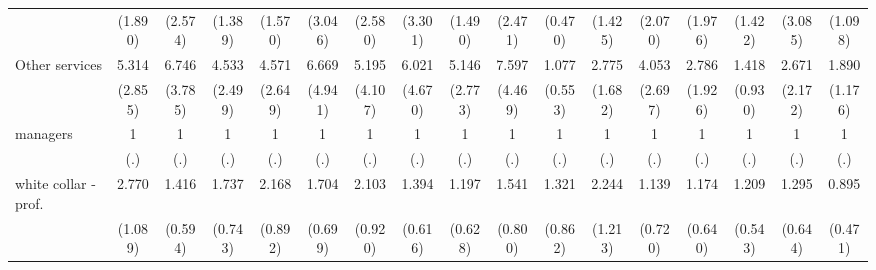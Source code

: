 {\begin{tabular}{l*{16}{c}}
                    &     (1.890)         &     (2.574)         &     (1.389)         &     (1.570)         &     (3.046)         &     (2.580)         &     (3.301)         &     (1.490)         &     (2.471)         &     (0.470)         &     (1.425)         &     (2.070)         &     (1.976)         &     (1.422)         &     (3.085)         &     (1.098)         \\
[1em]
Other services      &       5.314\sym{**} &       6.746\sym{***}&       4.533\sym{**} &       4.571\sym{**} &       6.669\sym{*}  &       5.195\sym{*}  &       6.021\sym{*}  &       5.146\sym{**} &       7.597\sym{***}&       1.077         &       2.775         &       4.053\sym{*}  &       2.786         &       1.418         &       2.671         &       1.890         \\
                    &     (2.855)         &     (3.785)         &     (2.499)         &     (2.649)         &     (4.941)         &     (4.107)         &     (4.670)         &     (2.773)         &     (4.469)         &     (0.553)         &     (1.682)         &     (2.697)         &     (1.926)         &     (0.930)         &     (2.172)         &     (1.176)         \\
[1em]
managers            &           1         &           1         &           1         &           1         &           1         &           1         &           1         &           1         &           1         &           1         &           1         &           1         &           1         &           1         &           1         &           1         \\
                    &         (.)         &         (.)         &         (.)         &         (.)         &         (.)         &         (.)         &         (.)         &         (.)         &         (.)         &         (.)         &         (.)         &         (.)         &         (.)         &         (.)         &         (.)         &         (.)         \\
[1em]
white collar - prof.&       2.770\sym{**} &       1.416         &       1.737         &       2.168         &       1.704         &       2.103         &       1.394         &       1.197         &       1.541         &       1.321         &       2.244         &       1.139         &       1.174         &       1.209         &       1.295         &       0.895         \\
                    &     (1.089)         &     (0.594)         &     (0.743)         &     (0.892)         &     (0.699)         &     (0.920)         &     (0.616)         &     (0.628)         &     (0.800)         &     (0.862)         &     (1.213)         &     (0.720)         &     (0.640)         &     (0.543)         &     (0.644)         &     (0.471)         \\

\end{tabular}}

